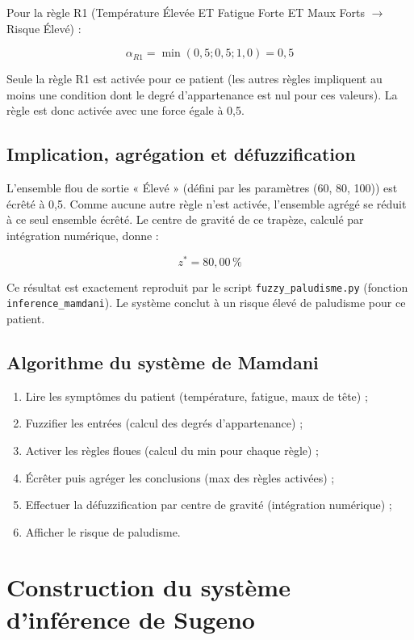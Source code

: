 \documentclass[a4paper,12pt]{report} %
\begin{document}
Pour la règle R1 (Température Élevée ET Fatigue Forte ET Maux Forts $\rightarrow$ Risque Élevé) :

\[
\alpha_{R1} = \min(0,5 ; 0,5 ; 1,0) = 0,5
\]

Seule la règle R1 est activée pour ce patient (les autres règles impliquent au moins une condition dont le degré d'appartenance est nul pour ces valeurs). La règle est donc activée avec une force égale à 0,5.

\subsection{Implication, agrégation et défuzzification}

L'ensemble flou de sortie « Élevé » (défini par les paramètres (60, 80, 100)) est écrêté à 0,5. Comme aucune autre règle n'est activée, l'ensemble agrégé se réduit à ce seul ensemble écrêté. Le centre de gravité de ce trapèze, calculé par intégration numérique, donne :

\[
z^* = 80{,}00\,\%
\]

Ce résultat est exactement reproduit par le script \texttt{fuzzy\_paludisme.py} (fonction \texttt{inference\_mamdani}). Le système conclut à un risque élevé de paludisme pour ce patient.

\subsection{Algorithme du système de Mamdani}

\begin{enumerate}
\item Lire les symptômes du patient (température, fatigue, maux de tête) ;
\item Fuzzifier les entrées (calcul des degrés d'appartenance) ;
\item Activer les règles floues (calcul du min pour chaque règle) ;
\item Écrêter puis agréger les conclusions (max des règles activées) ;
\item Effectuer la défuzzification par centre de gravité (intégration numérique) ;
\item Afficher le risque de paludisme.
\end{enumerate}

\section{Construction du système d'inférence de Sugeno}
\end{document}

